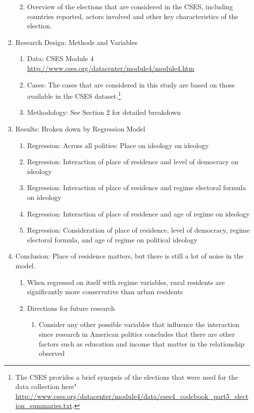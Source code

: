 \documentclass[12pt]{article}
\begin{document}
\begin{enumerate}
\begin{enumerate}
\begin{enumerate}
	\end{enumerate}
	\item Overview of the elections that are considered in the CSES, including countries reported, actors involved and other key characteristics of the election. 
\end{enumerate}
\item Research Design: Methods and Variables 
\begin{enumerate}
	\item Data: CSES Module 4 \url{http://www.cses.org/datacenter/module4/module4.htm}
	\item Cases: The cases that are considered in this study are based on those available in the CSES dataset.\footnote{The CSES provides a brief synopsis of the elections that were used for the data collection here" \url{http://www.cses.org/datacenter/module4/data/cses4_codebook_part5_election_summaries.txt}.}
	\item Methodology: See Section 2 for detailed breakdown
\end{enumerate}
\item Results: Broken down by Regression Model
\begin{enumerate}
	\item Regression: Across all polities: Place on ideology on ideology
	\item Regression: Interaction of place of residence and level of democracy on ideology
	\item Regression: Interaction of place of residence and regime electoral formula on ideology
	\item Regression: Interaction of place of residence and age of regime on ideology
	\item Regression: Consideration of place of residence, level of democracy, regime electoral formula, and age of regime on political ideology
\end{enumerate}
\item Conclusion: Place of residence matters, but there is still a lot of noise in the model.
\begin{enumerate}
	\item When regressed on itself with regime variables, rural residents are significantly more conservative than urban residents
	\item Directions for future research
	\begin{enumerate}
		\item Consider any other possible variables that influence the interaction since research in American politics concludes that there are other factors such as education and income that matter in the relationship observed \citep{gimpel_rural_2006}
	\end{enumerate}
\end{enumerate}
\end{enumerate}
\end{document}
